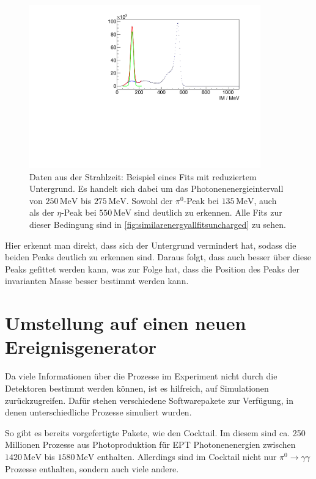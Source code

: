 \documentclass[a4paper,11pt,oneside,final,german,openbib,pdftex]{scrbook}
\begin{document}
{\begin{figure}[h!]
	\begin{center}
		\includegraphics[width=100mm]{NewCalib/Strahlzeit2014/20171904RealUnchargedFitExample}
	\end{center}
\caption[Strahlzeit: Beispiel eines Fits mit reduziertem Untergrund]{Daten aus der Strahlzeit: Beispiel eines Fits mit reduziertem Untergrund. Es handelt sich dabei um das Photonenenergieintervall von $250\,\text{MeV}$ bis $275\,\text{MeV}$. Sowohl der $\pi^0$-Peak bei $135 \,\text{MeV}$, auch als der $\eta$-Peak bei $550\,\text{MeV}$ sind deutlich zu erkennen. Alle Fits zur dieser Bedingung sind in \ref{fig:similarenergyallfitsuncharged} zu sehen.}
\label{fig:Reduzierter-Untergrund-Fit}
\end{figure}

 Hier erkennt man direkt, dass sich der Untergrund vermindert hat, sodass die beiden Peaks deutlich zu erkennen sind. Daraus folgt, dass auch besser \"uber diese Peaks gefittet werden kann, was zur Folge hat, dass die Position des Peaks der invarianten Masse besser bestimmt werden kann.


\section{Umstellung auf einen neuen Ereignisgenerator}
\label{sec:Vorbereitung-der-Simulation}

Da viele Informationen \"uber die Prozesse im Experiment nicht durch die Detektoren bestimmt werden k\"onnen, ist es hilfreich, auf Simulationen zur\"uckzugreifen. Daf\"ur stehen verschiedene Softwarepakete zur Verf\"ugung, in denen unterschiedliche Prozesse simuliert wurden.

So gibt es bereits vorgefertigte Pakete, wie den Cocktail.
Im diesem sind ca. 250 Millionen Prozesse aus Photoproduktion für EPT Photonenenergien zwischen $1420\,\text{MeV}$ bis $1580\,\text{MeV}$ enthalten. Allerdings sind im Cocktail nicht nur $\pi^0 \rightarrow \gamma \gamma$ Prozesse enthalten, sondern auch viele andere.

}
\end{document}
